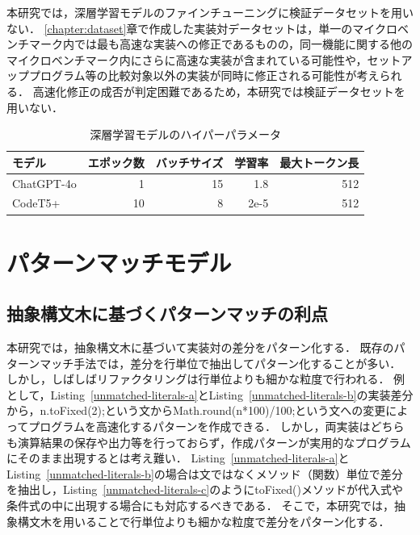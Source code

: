 \documentclass[11pt]{jreport}
\begin{document}
本研究では，深層学習モデルのファインチューニングに検証データセットを用いない．
\ref{chapter:dataset}章で作成した実装対データセットは，単一のマイクロベンチマーク内では最も高速な実装への修正であるものの，同一機能に関する他のマイクロベンチマーク内にさらに高速な実装が含まれている可能性や，セットアッププログラム等の比較対象以外の実装が同時に修正される可能性が考えられる．
高速化修正の成否が判定困難であるため，本研究では検証データセットを用いない．




\begin{table}[t]
\caption{深層学習モデルのハイパーパラメータ}
\label{table:model:params}
\centering
\begin{tabular}{lrrrr}
\hline
モデル & エポック数 & バッチサイズ & 学習率 & 最大トークン長 \\
\hline
ChatGPT-4o & 1 & 15 & 1.8 & 512 \\
CodeT5+ & 10 & 8 & 2e-5 & 512 \\
\hline
\end{tabular}
\end{table}




\section{パターンマッチモデル}




\subsection{抽象構文木に基づくパターンマッチの利点}


本研究では，抽象構文木に基づいて実装対の差分をパターン化する．
既存のパターンマッチ手法では，差分を行単位で抽出してパターン化することが多い．
しかし，しばしばリファクタリングは行単位よりも細かな粒度で行われる．
例として，Listing~\ref{unmatched-literals-a}とListing~\ref{unmatched-literals-b}の実装差分から，n.toFixed(2);という文からMath.round(n*100)/100;という文への変更によってプログラムを高速化するパターンを作成できる．
しかし，両実装はどちらも演算結果の保存や出力等を行っておらず，作成パターンが実用的なプログラムにそのまま出現するとは考え難い．
Listing~\ref{unmatched-literals-a}とListing~\ref{unmatched-literals-b}の場合は文ではなくメソッド（関数）単位で差分を抽出し，Listing~\ref{unmatched-literals-c}のようにtoFixed()メソッドが代入式や条件式の中に出現する場合にも対応するべきである．
そこで，本研究では，抽象構文木を用いることで行単位よりも細かな粒度で差分をパターン化する．
\end{document}
